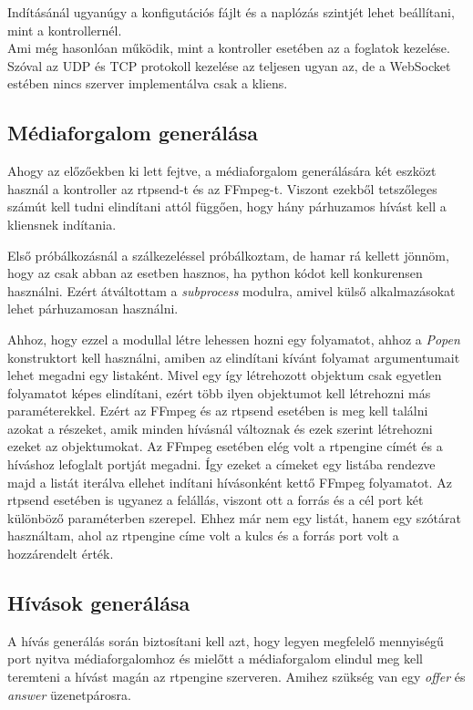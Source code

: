 Indításánál ugyanúgy a konfigutációs fájlt és a naplózás szintjét lehet beállítani,
mint a kontrollernél. \\

Ami még hasonlóan működik, mint a kontroller esetében az a foglatok kezelése.
Szóval az UDP és TCP protokoll kezelése az teljesen ugyan az, de a WebSocket estében
nincs szerver implementálva csak a kliens. 

\subsection{Médiaforgalom generálása}

Ahogy az előzőekben ki lett fejtve, a médiaforgalom generálására két eszközt 
használ a kontroller az rtpsend-t és az FFmpeg-t. Viszont ezekből tetszőleges
számút kell tudni elindítani attól függően, hogy hány párhuzamos hívást kell 
a kliensnek indítania.

Első próbálkozásnál a szálkezeléssel próbálkoztam, de hamar rá kellett jönnöm,
hogy az csak abban az esetben hasznos, ha python kódot kell konkurensen 
használni. Ezért átváltottam a \textit{subprocess} modulra, amivel külső alkalmazásokat
lehet párhuzamosan használni.

Ahhoz, hogy ezzel a modullal létre lehessen hozni egy folyamatot, ahhoz a \textit{Popen}
konstruktort kell használni, amiben az elindítani kívánt folyamat argumentumait lehet
megadni egy listaként. Mivel egy így létrehozott objektum csak egyetlen folyamatot 
képes elindítani, ezért több ilyen objektumot kell létrehozni más paraméterekkel. Ezért
az FFmpeg és az rtpsend esetében is meg kell találni azokat a részeket, amik minden 
hívásnál változnak és ezek szerint létrehozni ezeket az objektumokat. Az FFmpeg esetében
elég volt a rtpengine címét és a híváshoz lefoglalt portját megadni. Így ezeket a címeket
egy listába rendezve majd a listát iterálva ellehet indítani hívásonként kettő
FFmpeg folyamatot. Az rtpsend esetében is ugyanez a felállás, viszont ott a forrás és 
a cél port két különböző paraméterben szerepel. Ehhez már nem egy listát, hanem egy 
szótárat használtam, ahol az rtpengine címe volt a kulcs és a forrás port volt a hozzárendelt
érték.

\subsection{Hívások generálása}

A hívás generálás során biztosítani kell azt, hogy legyen megfelelő mennyiségű port
nyitva médiaforgalomhoz és mielőtt a médiaforgalom elindul meg kell teremteni a hívást
magán az rtpengine szerveren. Amihez szükség van egy \textit{offer} és \textit{answer}
üzenetpárosra.

